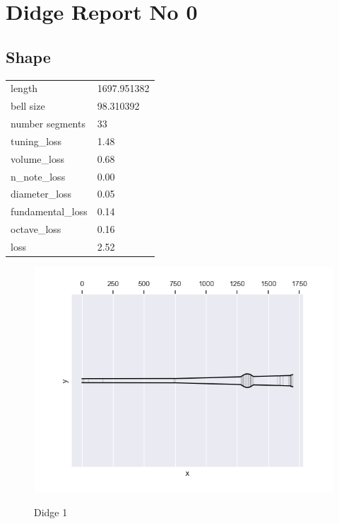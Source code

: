\documentclass{article}
\begin{document}
\section{Didge Report No 0}

\subsection{Shape}
\begin{centering}
\begin{tabular}{ll}
\toprule
          length &  1697.951382 \\
       bell size &    98.310392 \\
 number segments &           33 \\
     tuning\_loss &         1.48 \\
     volume\_loss &         0.68 \\
     n\_note\_loss &         0.00 \\
   diameter\_loss &         0.05 \\
fundamental\_loss &         0.14 \\
     octave\_loss &         0.16 \\
            loss &         2.52 \\
\bottomrule
\end{tabular}
\end{centering}


\begin{centering}
\begin{figure}[!h]
{\includegraphics[width=\textwidth]
{0_didge.png}}
\caption{Didge 1}
\end{figure}
\end{centering}
\end{document}
